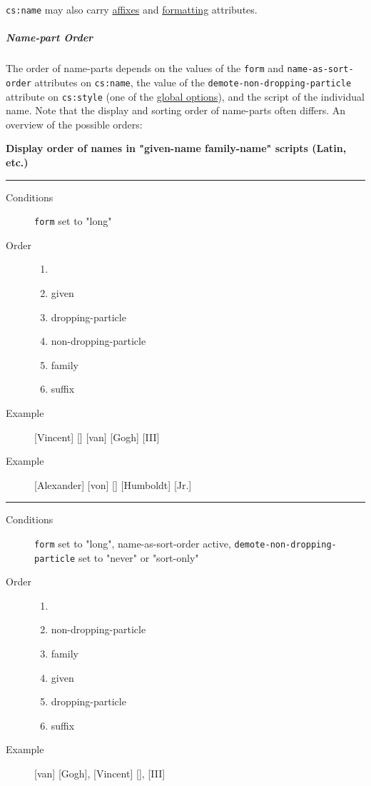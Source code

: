 \texttt{cs:name} may also carry \protect\hyperlink{affixes}{affixes} and
\protect\hyperlink{formatting}{formatting} attributes.

\hypertarget{name-part-order}{%
\subparagraph{Name-part Order}\label{name-part-order}}

The order of name-parts depends on the values of the \texttt{form} and
\texttt{name-as-sort-order} attributes on \texttt{cs:name}, the value of
the \texttt{demote-non-dropping-particle} attribute on \texttt{cs:style}
(one of the \protect\hyperlink{global-options}{global options}), and the
script of the individual name. Note that the display and sorting order
of name-parts often differs. An overview of the possible orders:

\textbf{Display order of names in "given-name family-name" scripts
(Latin, etc.)}

\begin{center}\rule{0.5\linewidth}{0.5pt}\end{center}

\begin{description}
\item[Conditions]
\texttt{form} set to "long"
\item[Order]
\begin{enumerate}
\def\labelenumi{\arabic{enumi})}
\tightlist
\item[]
\item
  given
\item
  dropping-particle
\item
  non-dropping-particle
\item
  family
\item
  suffix
\end{enumerate}
\item[Example]
{[}Vincent{]} {[}{]} {[}van{]} {[}Gogh{]} {[}III{]}
\item[Example]
{[}Alexander{]} {[}von{]} {[}{]} {[}Humboldt{]} {[}Jr.{]}
\end{description}

\begin{center}\rule{0.5\linewidth}{0.5pt}\end{center}

\begin{description}
\item[Conditions]
\texttt{form} set to "long", name-as-sort-order active,
\texttt{demote-non-dropping-particle} set to "never" or "sort-only"
\item[Order]
\begin{enumerate}
\def\labelenumi{\arabic{enumi})}
\tightlist
\item[]
\item
  non-dropping-particle
\item
  family
\item
  given
\item
  dropping-particle
\item
  suffix
\end{enumerate}
\item[Example]
{[}van{]} {[}Gogh{]}, {[}Vincent{]} {[}{]}, {[}III{]}
\end{description}

